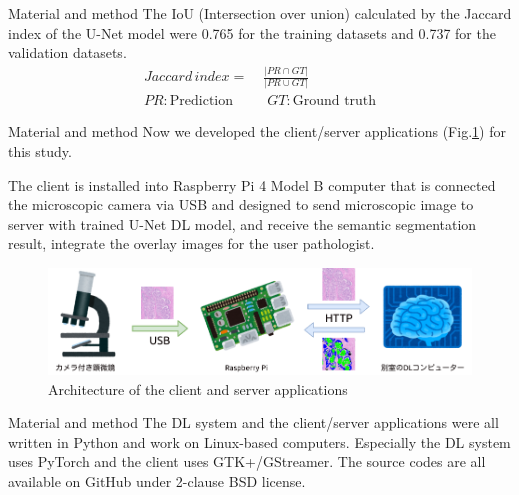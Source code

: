 \documentclass[
  dvipdfmx,
  xcolor={svgnames},
  hyperref={colorlinks,citecolor=DeepPink4,linkcolor=DarkRed,urlcolor=DarkBlue}
  ]{beamer}
\begin{document}
\begin{frame}{Material and method}
  The IoU (Intersection over union) calculated by the Jaccard index of the U-Net model were 0.765 for the training datasets and 0.737 for the validation datasets.
  \begin{align}
    \label{eq:iou}
    Jaccard\,index = & \; \frac{|PR \cap GT|}{|PR \cup GT|} \\[5mm]
    PR: \mbox{Prediction} & \;\; GT: \mbox{Ground truth} \nonumber
  \end{align}
\end{frame}

\begin{frame}{Material and method}
  Now we developed the client/server applications (Fig.\ref{fig:arch}) for this study.
  \par
  \vspace{0.5zh}
  The client is installed into Raspberry Pi 4 Model B computer that is connected the microscopic camera via USB and designed to send microscopic image to server with trained U-Net DL model, and receive the semantic segmentation result, integrate the overlay images for the user pathologist.
  \begin{figure}\centering
    \includegraphics[width=0.8\columnwidth]{assets/arch.png}
    \caption{Architecture of the client and server applications}
    \label{fig:arch}
  \end{figure}
\end{frame}

\begin{frame}{Material and method}
  The DL system and the client/server applications were all written in Python and work on Linux-based computers. Especially the DL system uses PyTorch and the client uses GTK+/GStreamer. The source codes are all available on GitHub under 2-clause BSD license. \cite{gh-prostate}\cite{gh-pai}
\end{frame}
\end{document}
